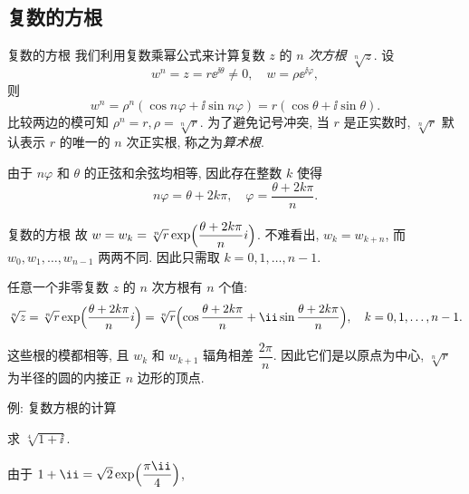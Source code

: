 \subsection{复数的方根}
\begin{frame}{复数的方根}
	\onslide<+->
	我们利用复数乘幂公式来计算复数 $z$ 的 \emph{$n$ 次方根 $\sqrt[n]z$}.
	\onslide<+->
	设
	\[w^n=z=r\ee^{\ii\theta}\neq0,\quad w=\rho \ee^{\ii\varphi},
	\]
	\onslide<+->
	则
	\[w^n=\rho^n(\cos{n\varphi}+\ii\sin{n\varphi})=r(\cos\theta+\ii\sin\theta).
	\]
	\onslide<+->
	比较两边的模可知 $\rho^n=r,\rho=\sqrt[n]r$.
	\onslide<+->
	为了避免记号冲突, 当 $r$ 是正实数时, $\sqrt[n]r$ 默认表示 $r$ 的唯一的 $n$ 次正实根, 称之为\emph{算术根}.

	\onslide<+->
	由于 $n\varphi$ 和 $\theta$ 的正弦和余弦均相等, 因此存在整数 $k$ 使得
	\[n\varphi=\theta+2k\pi,\quad \varphi=\frac{\theta+2k\pi}n.
	\]
\end{frame}


\begin{frame}{复数的方根}
	\onslide<+->
	故 $w=w_k=\sqrt[n]r\exp\Bigl(\dfrac{\theta+2k\pi}ni\Bigr)$.
	\onslide<+->
	不难看出, $w_k=w_{k+n}$, 而 $w_0,w_1,\dots,w_{n-1}$ 两两不同.
	因此只需取 $k=0,1,\dots,n-1$.
	\onslide<+->
	\begin{theorem}[复数的方根]
		任意一个非零复数 $z$ 的 $n$ 次方根有 $n$ 个值:
	\[
			\sqrt[n]z=\sqrt[n]r\exp\Bigl(\dfrac{\theta+2k\pi}ni\Bigr)\\
				=\sqrt[n]r\Bigl(\cos\frac{\theta+2k\pi}n+\ii\sin\frac{\theta+2k\pi}n\Bigr),\quad k=0,1,\dots,n-1.
	\]
	\end{theorem}
	\onslide<+->
	这些根的模都相等, 且 $w_k$ 和 $w_{k+1}$ 辐角相差 $\dfrac{2\pi}n$.
	\onslide<+->
	因此\alert{它们是以原点为中心, $\sqrt[n]r$ 为半径的圆的内接正 $n$ 边形的顶点}.
\end{frame}


\begin{frame}{例: 复数方根的计算}
	\onslide<+->
	\begin{example}
		求 $\sqrt[4]{1+\ii}$.
	\end{example}

	\onslide<+->
	\begin{solution}
		由于 $1+\ii=\sqrt2\exp\Bigl(\dfrac{\pi\ii}4\Bigr)$,
		\onslide<+->{%
			于是该方根所有值为
			\[w_0=\sqrt[8]2\ee^{\frac{\pi\ii}{16}},\quad
			w_1=\sqrt[8]2\ee^{\frac{9\pi\ii}{16}},\quad
			w_2=\sqrt[8]2\ee^{\frac{17\pi\ii}{16}},\quad
			w_3=\sqrt[8]2\ee^{\frac{25\pi\ii}{16}}.
	\]
		}
		\vspace{-\baselineskip}
	\end{solution}
\end{frame}


